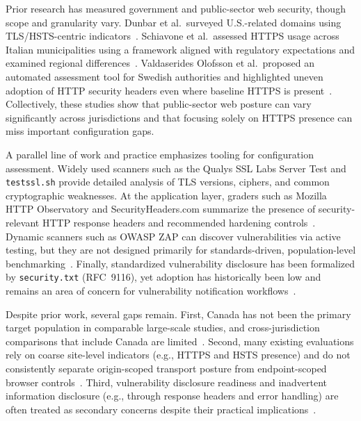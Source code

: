 \documentclass[conference]{IEEEtran}
\begin{document}
  Prior research has measured government and public-sector web security, though scope and granularity vary. 
  Dunbar et al.\ surveyed U.S.-related domains using TLS/HSTS-centric indicators~\cite{dunbar4240917survey}. 
  Schiavone et al.\ assessed HTTPS usage across Italian municipalities using a framework aligned with regulatory expectations and examined regional differences~\cite{schiavone2024municipality2https}. 
  Valdaserides Olofsson et al.\ proposed an automated assessment tool for Swedish authorities and highlighted uneven adoption of HTTP security headers even where baseline HTTPS is present~\cite{valdaserides2024automated}. 
  Collectively, these studies show that public-sector web posture can vary significantly across jurisdictions and that focusing solely on HTTPS presence can miss important configuration gaps.

  A parallel line of work and practice emphasizes tooling for configuration assessment. 
  Widely used scanners such as the Qualys SSL Labs Server Test and \texttt{testssl.sh} provide detailed analysis of TLS versions, ciphers, and common cryptographic weaknesses. At the application layer, graders such as Mozilla HTTP Observatory and SecurityHeaders.com summarize the presence of security-relevant HTTP response headers and recommended hardening controls~\cite{tool_mozilla_observatory}. Dynamic scanners such as OWASP ZAP can discover vulnerabilities via active testing, but they are not designed primarily for standards-driven, population-level benchmarking~\cite{tool_owasp_zap}. Finally, standardized vulnerability disclosure has been formalized by \texttt{security.txt} (RFC~9116), yet adoption has historically been low and remains an area of concern for vulnerability notification workflows~\cite{rfc9116}.

  Despite prior work, several gaps remain. 
  First, Canada has not been the primary target population in comparable large-scale studies, and cross-jurisdiction comparisons that include Canada are limited~\cite{dunbar4240917survey,schiavone2024municipality2https}. 
  Second, many existing evaluations rely on coarse site-level indicators (e.g., HTTPS and HSTS presence) and do not consistently separate origin-scoped transport posture from endpoint-scoped browser controls~\cite{dunbar4240917survey,valdaserides2024automated}. 
  Third, vulnerability disclosure readiness and inadvertent information disclosure (e.g., through response headers and error handling) are often treated as secondary concerns despite their practical implications~\cite{rfc9116,cwe_209}. 
\end{document}
